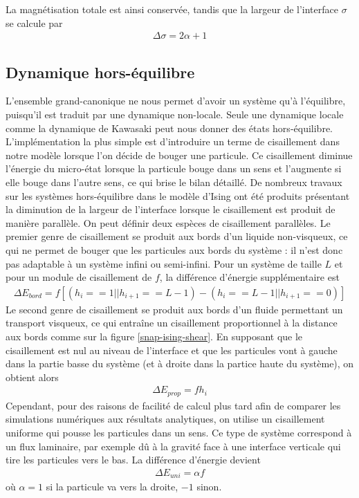 La magnétisation totale est ainsi conservée, tandis que la largeur de l'interface $\sigma$ se calcule par
\begin{align}
	\Delta \sigma = 2 \alpha  + 1
\end{align}

	\subsection{Dynamique hors-équilibre}
L'ensemble grand-canonique ne nous permet d'avoir un système qu'à l'équilibre, puisqu'il est traduit par une dynamique non-locale. Seule une dynamique locale comme la dynamique de Kawasaki peut nous donner des états hors-équilibre. L'implémentation la plus simple est d'introduire un terme de cisaillement dans notre modèle lorsque l'on décide de bouger une particule. Ce cisaillement diminue l'énergie du micro-état lorsque la particule bouge dans un sens et l'augmente si elle bouge dans l'autre sens, ce qui brise le bilan détaillé. De nombreux travaux sur les systèmes hors-équilibre dans le modèle d'Ising ont été produits \cite{smith_interfaces_2008} présentant la diminution de la largeur de l'interface lorsque le cisaillement est produit de manière parallèle. 
On peut définir deux espèces de cisaillement parallèles.
Le premier genre de cisaillement se produit aux bords d'un liquide non-visqueux, ce qui ne permet de bouger que les particules aux bords du système : il n'est donc pas adaptable à un système infini ou semi-infini. Pour un système de taille $L$ et pour un module de cisaillement de $f$, la différence d'énergie supplémentaire est 
\begin{align}
	\Delta E_{bord} = f [ (h_i == 1 || h_{i+1} == L-1) - (h_i == L-1 || h_{i+1} == 0)  ]
\end{align}
Le second genre de cisaillement se produit aux bords d'un fluide permettant un transport visqueux, ce qui entraîne un cisaillement proportionnel à la distance aux bords comme sur la figure \ref{snap-ising-shear}. En supposant que le cisaillement est nul au niveau de l'interface et que les particules vont à gauche dans la partie basse du système (et à droite dans la partice haute du système), on obtient alors
\begin{align}
	\Delta E_{prop} = f h_i
\end{align}
Cependant, pour des raisons de facilité de calcul plus tard afin de comparer les simulations numériques aux résultats analytiques, on utilise un cisaillement uniforme qui pousse les particules dans un sens. Ce type de système correspond à un flux laminaire, par exemple dû à la gravité face à une interface verticale qui tire les particules vers le bas. La différence d'énergie devient
\begin{align}
	\Delta E_{uni} = \alpha f
\end{align}
où $\alpha = 1$ si la particule va vers la droite, $-1$ sinon. 
		
